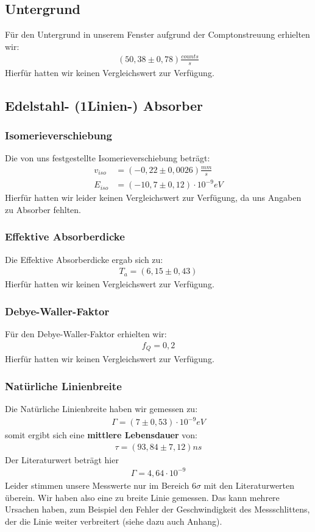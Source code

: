 \documentclass[12pt]{article}
\begin{document}
\subsection*{Untergrund}
Für den Untergrund in unserem Fenster aufgrund der Comptonstreuung erhielten wir:
\begin{align*}
 (50,38 \pm 0,78) \frac{counts}{s}
\end{align*}
Hierfür hatten wir keinen Vergleichswert zur Verfügung.

\subsection*{Edelstahl- (1Linien-) Absorber}
\subsubsection*{Isomerieverschiebung}
Die von uns festgestellte Isomerieverschiebung beträgt:
\begin{align*}
 v_{iso} &= ( -0,22 \pm 0,0026) \frac{mm}{s} \\
 E_{iso} &= ( -10,7 \pm 0,12 ) \cdot 10^{-9} eV
\end{align*}
Hierfür hatten wir leider keinen Vergleichswert zur Verfügung, da uns Angaben zu Absorber fehlten.

\subsubsection*{Effektive Absorberdicke}
Die Effektive Absorberdicke ergab sich zu:
\begin{align*}
 T_a = ( 6,15 \pm 0,43 )
\end{align*}
Hierfür hatten wir keinen Vergleichswert zur Verfügung.

\subsubsection*{Debye-Waller-Faktor}
Für den Debye-Waller-Faktor erhielten wir:
\begin{align*}
 f_Q = 0,2
\end{align*}
Hierfür hatten wir keinen Vergleichswert zur Verfügung.

\subsubsection*{Natürliche Linienbreite}
Die Natürliche Linienbreite haben wir gemessen zu:
\begin{align*}
 \Gamma = ( 7 \pm 0,53) \cdot 10^{-9} eV
\end{align*}
somit ergibt sich eine \textbf{mittlere Lebensdauer} von:
\begin{align*}
 \tau = (93,84 \pm 7,12) ns
\end{align*}
Der Literaturwert beträgt hier
\begin{align*}
 \Gamma = 4,64 \cdot 10^{-9} 
\end{align*}
Leider stimmen unsere Messwerte nur im Bereich $6\sigma$ mit den Literaturwerten überein. Wir haben also eine zu breite Linie gemessen. 
Das kann mehrere Ursachen haben, zum Beispiel den Fehler der Geschwindigkeit des Messschlittens, der die Linie weiter verbreitert (siehe dazu auch Anhang).
\end{document}
